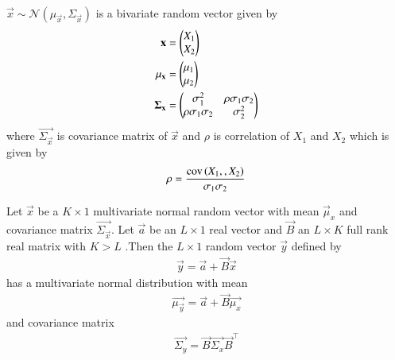 \begin{definition}
    $\vec{x}\sim\mathcal{N}(\mu_{\vec{x}},\Sigma_{\vec{x}})$ is a bivariate random vector given by
    \begin{align}
        \mathbf{x}&=\begin{pmatrix}X_1\\
                       X_2\end{pmatrix}\\
        \mathbf{\mu_{\mathbf{x}}}&=\begin{pmatrix}\mu_1\\
                                    \mu_2\end{pmatrix}\\
        \mathbf{\Sigma_{\mathbf{x}}}&=\begin{pmatrix}\sigma_1^2&\rho\sigma_1\sigma_2\\
                                        \rho\sigma_1\sigma_2&\sigma_2^2\end{pmatrix}
    \end{align}
    where $\vec{\Sigma_{\vec{x}}}$ is covariance matrix of $\vec{x}$ and $\rho$ is correlation of $X_1$ and $X_2$ which is given by
    \begin{align}
        \rho=\frac{\text{cov}\left({X_1}, {,X_2} \right)}{\sigma_1\sigma_2}
    \end{align}
\end{definition}
\begin{lemma}
    \label{gauss/4/stats}
    Let $\vec{x}$ be a $K\times1$ multivariate normal random vector with mean $\vec{\mu}_x$ and covariance matrix $\vec{\Sigma_{\vec{x}}}$. Let $\vec{a}$ be an $L\times1$ real vector and $\vec{B}$ an $L\times K$ full rank real matrix with $K>L$ .Then the $L\times1$ random vector $\vec{y}$ defined by
    \begin{align}
        \vec{y}=\vec{a}+\vec{B}\vec{x}
    \end{align}
    has a multivariate normal distribution with mean
    \begin{align}
        \vec{\mu_\vec{y}}=\vec{a}+\vec{B}\vec{\mu_x}
    \end{align}
    and covariance matrix
    \begin{align}
        \vec{\Sigma_y}=\vec{B}\vec{\Sigma_x}\vec{B}^{\top}
    \end{align}
\end{lemma}

